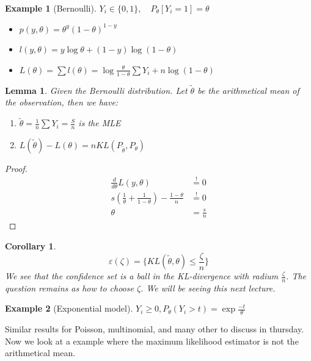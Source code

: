 \documentclass[a4paper,12pt, oneside, fleqn]{book}
\newtheorem{corollary}{Corollary}[theorem]
\newtheorem{lemma}[theorem]{Lemma}
\theoremstyle{definition}
\newtheorem*{example}{Example}
\theoremstyle{remark}
\begin{document}
\begin{example}[Bernoulli]
	$Y_i \in \{0, 1\}, \quad P_\theta[Y_i = 1] = \theta $
	\begin{itemize}
		\item $p(y, \theta) = \theta^y (1-\theta)^{1-y}$
		\item $l(y, \theta) = y \log \theta + (1 - y) \log(1 - \theta)$
		\item $L(\theta) = \sum l(\theta) = \log \frac{\theta}{1 - \theta} \sum Y_i + n\log (1 - \theta)$
	\end{itemize}
\end{example}

\begin{lemma}
Given the Bernoulli distribution. Let $\tilde{\theta}$ be the arithmetical mean of the observation, then we have:
\begin{enumerate}
	\item $\tilde{\theta} = \frac{1}{n} \sum Y_i = \frac{S}{n}$ is the MLE
	\item $L(\tilde{\theta}) - L(\theta) = nKL(P_{\tilde{\theta}}, P_\theta)$
\end{enumerate}
\end{lemma}

\begin{proof}
	\begin{align*}
			\frac{d}{d\theta} L(y, \theta) &\overset{!}{=} 0\\
			s(\frac{1}{\theta} + \frac{1}{1 - \theta}) - \frac{1 - \theta}{n} &\overset{!}{=} 0\\
			\theta &= \frac{s}{n}
	\end{align*}
\end{proof}


\begin{corollary}
\begin{equation*}
		\varepsilon(\zeta) = \{KL(\tilde{\theta}, \theta) \leq \frac{\zeta}{n} \}
\end{equation*}
We see that the confidence set is a ball in the KL-divergence with radium $\frac{\zeta}{n}$. 
The question remains as how to choose $\zeta$. We will be seeing this next lecture. 
\end{corollary}

\begin{example}[Exponential model]
	$Y_i \geq 0, P_\theta(Y_i > t) = \exp{\frac{-t}{\theta}}$
\end{example}


Similar results for Poisson, multinomial, and many other to discuss in thursday. Now we look at a example where the maximum likelihood estimator is not the arithmetical mean.
\end{document}
